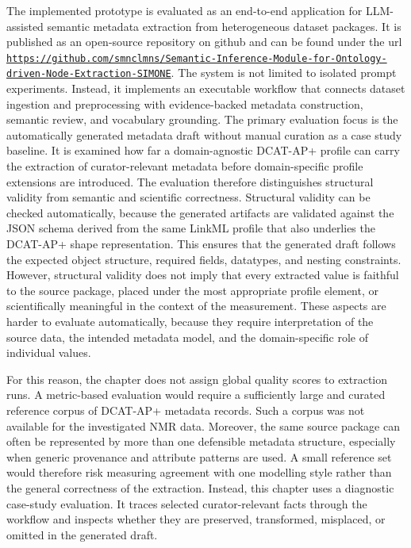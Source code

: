 \label{chap:results_and_evaluations}

The implemented prototype is evaluated as an end-to-end application for \ac{LLM}-assisted semantic metadata extraction from heterogeneous dataset packages.
It is published as an open-source repository on github and can be found under the url \href{https://github.com/smnclmns/Semantic-Inference-Module-for-Ontology-driven-Node-Extraction-SIMONE}{\nolinkurl{https://github.com/smnclmns/Semantic-Inference-Module-for-Ontology-driven-Node-Extraction-SIMONE}}.
The system is not limited to isolated prompt experiments.
Instead, it implements an executable workflow that connects dataset ingestion and preprocessing with evidence-backed metadata construction, semantic review, and vocabulary grounding.
The primary evaluation focus is the automatically generated metadata draft without manual curation as a case study baseline.
It is examined how far a domain-agnostic \ac{DCAT-AP+} profile can carry the extraction of curator-relevant metadata before domain-specific profile extensions are introduced.
The evaluation therefore distinguishes structural validity from semantic and scientific correctness.
Structural validity can be checked automatically, because the generated artifacts are validated against the \ac{JSON} schema derived from the same \ac{LinkML} profile that also underlies the \ac{DCAT-AP+} shape representation.
This ensures that the generated draft follows the expected object structure, required fields, datatypes, and nesting constraints.
However, structural validity does not imply that every extracted value is faithful to the source package, placed under the most appropriate profile element, or scientifically meaningful in the context of the measurement.
These aspects are harder to evaluate automatically, because they require interpretation of the source data, the intended metadata model, and the domain-specific role of individual values.

For this reason, the chapter does not assign global quality scores to extraction runs.
A metric-based evaluation would require a sufficiently large and curated reference corpus of \ac{DCAT-AP+} metadata records.
Such a corpus was not available for the investigated \ac{NMR} data.
Moreover, the same source package can often be represented by more than one defensible metadata structure, especially when generic provenance and attribute patterns are used.
A small reference set would therefore risk measuring agreement with one modelling style rather than the general correctness of the extraction.
Instead, this chapter uses a diagnostic case-study evaluation.
It traces selected curator-relevant facts through the workflow and inspects whether they are preserved, transformed, misplaced, or omitted in the generated draft.

